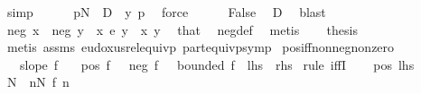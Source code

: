 \begin{isabellebody}
\ simp\isanewline
\ \ \ \ \isamarkupfalse%
\ {\isachardoublequoteopen}{\isasymforall}p{\isasymge}N{\isachardot}{\kern0pt}\ {\isacharminus}{\kern0pt}\ D\ {\isasymge}\ y\ p{\isachardoublequoteclose}\ \isamarkupfalse%
\ force\isanewline
\ \ \ \ \isamarkupfalse%
\ False\ \isamarkupfalse%
\ D\ \isamarkupfalse%
\ blast\isanewline
\ \ \isacommand{{\isacharbraceright}{\kern0pt}}\isamarkupfalse%
\isanewline
\ \ \isamarkupfalse%
\ {\isachardoublequoteopen}neg\ x\ {\isasymLongrightarrow}\ neg\ y{\isachardoublequoteclose}\ \ {\isachardoublequoteopen}x\ {\isasymsim}\isactrlsub e\ y{\isachardoublequoteclose}\ \ x\ y\ \isamarkupfalse%
\ that\ \isamarkupfalse%
\ neg{\isacharunderscore}{\kern0pt}def\ \isamarkupfalse%
\ metis\isanewline
\ \ \isamarkupfalse%
\ {\isacharquery}{\kern0pt}thesis\ \isamarkupfalse%
\ {\isacharparenleft}{\kern0pt}metis\ assms\ eudoxus{\isacharunderscore}{\kern0pt}rel{\isacharunderscore}{\kern0pt}equivp\ part{\isacharunderscore}{\kern0pt}equivp{\isacharunderscore}{\kern0pt}symp{\isacharparenright}{\kern0pt}\isanewline
{}\isamarkupfalse%
%
\endisatagproof
{\isafoldproof}%
%
\isadelimproof
\isanewline
%
\endisadelimproof
\isanewline
{}\isamarkupfalse%
\ pos{\isacharunderscore}{\kern0pt}iff{\isacharunderscore}{\kern0pt}nonneg{\isacharunderscore}{\kern0pt}nonzero{\isacharcolon}{\kern0pt}\ \isanewline
\ \ \ {\isachardoublequoteopen}slope\ f{\isachardoublequoteclose}\isanewline
\ \ \ {\isachardoublequoteopen}pos\ f\ {\isasymlongleftrightarrow}\ {\isacharparenleft}{\kern0pt}{\isasymnot}\ neg\ f{\isacharparenright}{\kern0pt}\ {\isasymand}\ {\isacharparenleft}{\kern0pt}{\isasymnot}\ bounded\ f{\isacharparenright}{\kern0pt}{\isachardoublequoteclose}\ {\isacharparenleft}{\kern0pt}\ {\isachardoublequoteopen}{\isacharquery}{\kern0pt}lhs\ {\isasymlongleftrightarrow}\ {\isacharquery}{\kern0pt}rhs{\isachardoublequoteclose}{\isacharparenright}{\kern0pt}\isanewline
%
\isadelimproof
%
\endisadelimproof
%
\isatagproof
{}\isamarkupfalse%
\ {\isacharparenleft}{\kern0pt}rule\ iffI{\isacharparenright}{\kern0pt}\isanewline
\ \ \isamarkupfalse%
\ pos{\isacharcolon}{\kern0pt}\ {\isacharquery}{\kern0pt}lhs\isanewline
\ \ \isamarkupfalse%
\ \isamarkupfalse%
\ N\ \ {\isachardoublequoteopen}{\isasymforall}n{\isasymge}N{\isachardot}{\kern0pt}\ f\ n\ {\isachargreater}{\kern0pt}\ {}{\isachardoublequoteclose}\ \isamarkupfalse%

\end{isabellebody}
